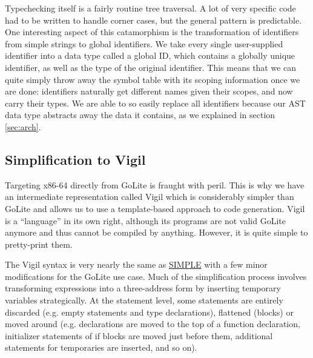 \documentclass[letterpaper,11pt]{article}
\begin{document}
Typechecking itself is a fairly routine tree traversal. A lot of very specific code had to be written to handle corner cases, but the general pattern is predictable. One interesting aspect of this catamorphism is the transformation of identifiers from simple strings to global identifiers. We take every single user-supplied identifier into a data type called a global ID, which contains a globally unique identifier, as well as the type of the original identifier. This means that we can quite simply throw away the symbol table with its scoping information once we are done: identifiers naturally get different names given their scopes, and now carry their types. We are able to so easily replace all identifiers because our AST data type abstracts away the data it contains, as we explained in section \ref{sec:arch}.


\subsection{Simplification to Vigil}
\label{sec:ph_simpl}

Targeting x86-64 directly from GoLite is fraught with peril. This is why we have an intermediate representation called Vigil which is considerably simpler than GoLite and allows us to use a template-based approach to code generation. Vigil is a ``language'' in its own right, although its programs are not valid GoLite anymore and thus cannot be compiled by anything. However, it is quite simple to pretty-print them.

The Vigil syntax is very nearly the same as \href{https://web.archive.org/web/20040308142632/http://www-acaps.cs.mcgill.ca/info/McCAT/public/intermediate.html#SIMPLE}{SIMPLE} with a few minor modifications for the GoLite use case. Much of the simplification process involves transforming expressions into a three-address form by inserting temporary variables strategically. At the statement level, some statements are entirely discarded (e.g. empty statements and type declarations), flattened (blocks) or moved around (e.g. declarations are moved to the top of a function declaration, initializer statements of if blocks are moved just before them, additional statements for temporaries are inserted, and so on).
\end{document}
